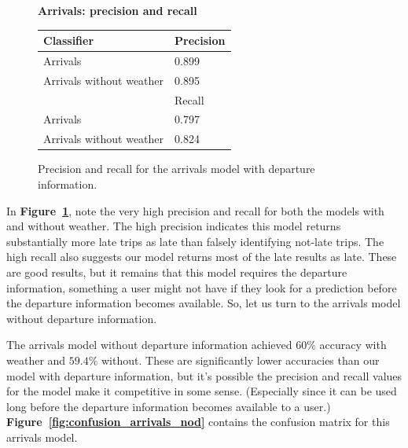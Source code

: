 \documentclass[11pt]{article} %
\begin{document}
\begin{figure}
    \textbf{Arrivals: precision and recall}

    \begin{tabular}{l|l}
         Classifier & Precision\\
         \hline
         Arrivals & 0.899\\
         Arrivals without weather & 0.895\\
         \hline
         & Recall\\
         \hline
         Arrivals & 0.797\\
         Arrivals without weather & 0.824\\
    \end{tabular}
    \caption{Precision and recall for the arrivals model with departure 
    information.}
    \label{fig:pr_arrivals}
\end{figure}

In \textbf{Figure~\ref{fig:pr_arrivals}}, note the very high precision and recall 
for both the models with and without weather.  The high precision indicates this
model returns substantially more late trips as late than falsely identifying
not-late trips. The high recall also suggests our model returns most of
the late results as late. These are good results, but it remains that this
model requires the departure information, something a user might not have if they
look for a prediction before the departure information becomes available. So, let
us turn to the arrivals model without departure information.

The arrivals model without departure information achieved $60\%$ accuracy with
weather and $59.4\%$ without.  These are significantly lower accuracies than
our model with departure information, but it's possible the precision and recall
values for the model make it competitive in some sense. (Especially since it can
be used long before the departure information becomes available to a user.)
\textbf{Figure~\ref{fig:confusion_arrivals_nod}} contains the confusion matrix 
for this arrivals model.
\end{document}
